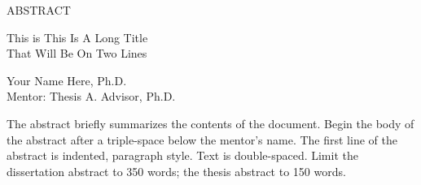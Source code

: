\documentclass[12pt]{report} %
\newcommand{\mytitle}{This is This Is A Long Title\\ That Will Be On Two Lines} %
\newcommand{\myname}{Your Name Here} %
\newcommand{\degreesought}{Ph.D.} %
\newcommand{\mymentor}{Thesis A. Advisor, Ph.D.} %
\numberwithin{equation}{subsection}
\numberwithin{figure}{chapter} %
\theoremstyle{numbernote}
\theoremstyle{nonumber}
\theoremstyle{nonumbernonote}
\theoremstyle{nonote}
\begin{document}

\renewcommand\contentsname{\vspace{-.75in} {\centering \normalsize{ \textnormal{TABLE OF CONTENTS} } \par}} %
\renewcommand\listfigurename{\vspace{-.75in} {\centering \normalsize{ \textnormal{LIST OF FIGURES} } \par}} %
\renewcommand\listtablename{\vspace{-.75in} {\centering \normalsize{ \textnormal{LIST OF TABLES} } \par}}   %





\thispagestyle{empty}

{\centering ABSTRACT\\
   
    \begin{singlespacing}
    \mytitle{}\\            %
    \end{singlespacing}

 \myname{}, \degreesought{} \\
    
Mentor: \mymentor{}
\par} 

\vspace{12.96pt} %

The abstract briefly summarizes the contents of the document. Begin the body of the abstract after a triple-space below the mentor’s name. The first line of the abstract is indented, paragraph style. Text is double-spaced. Limit the
dissertation abstract to 350 words; the thesis abstract to 150 words.
\end{document}
